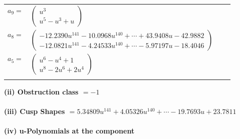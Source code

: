 \documentclass[1p]{elsarticle_modified}
\theoremstyle{definition}
\begin{document}
\begin{tabular}{m{7pt} m{180pt} m{7pt} m{180pt} }
\flushright $a_{9}=$&$\begin{pmatrix}u^3\\u^5- u^3+u\end{pmatrix}$ \\
\flushright $a_{8}=$&$\begin{pmatrix}-12.2390 u^{141}-10.0968 u^{140}+\cdots+43.9408 u-42.9882\\-12.0821 u^{141}-4.24533 u^{140}+\cdots-5.97197 u-18.4046\end{pmatrix}$ \\
\flushright $a_{5}=$&$\begin{pmatrix}u^6- u^4+1\\u^8-2 u^6+2 u^4\end{pmatrix}$\\&\end{tabular}
\flushleft \textbf{(ii) Obstruction class $= -1$}\\~\\
\flushleft \textbf{(iii) Cusp Shapes $= 5.34809 u^{141}+4.05326 u^{140}+\cdots-19.7693 u+23.7811$}\\~\\
\newpage\renewcommand{\arraystretch}{1}
\flushleft \textbf{(iv) u-Polynomials at the component}\newline \\
\end{document}
